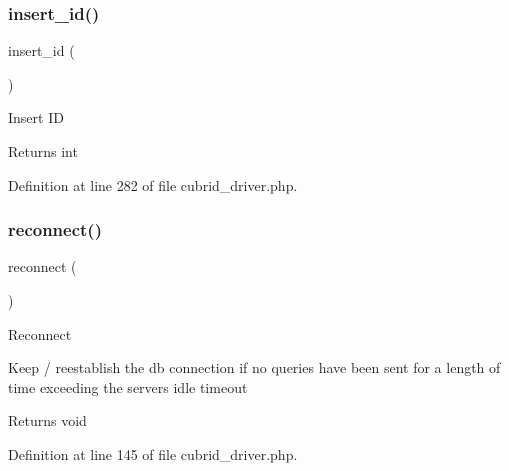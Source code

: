 \mbox{\label{class_c_i___d_b__cubrid__driver_a933f2cde8dc7f87875e257d0a4902e99}} 
\subsubsection{\texorpdfstring{insert\_id()}{insert\_id()}}
{\footnotesize\ttfamily insert\+\_\+id (\begin{DoxyParamCaption}{ }\end{DoxyParamCaption})}

Insert ID

\begin{DoxyReturn}{Returns}
int 
\end{DoxyReturn}


Definition at line 282 of file cubrid\+\_\+driver.\+php.

\mbox{\label{class_c_i___d_b__cubrid__driver_a57c19c642ab3023e28d10c50f86ff0a8}} 
\subsubsection{\texorpdfstring{reconnect()}{reconnect()}}
{\footnotesize\ttfamily reconnect (\begin{DoxyParamCaption}{ }\end{DoxyParamCaption})}

Reconnect

Keep / reestablish the db connection if no queries have been sent for a length of time exceeding the server\textquotesingle{}s idle timeout

\begin{DoxyReturn}{Returns}
void 
\end{DoxyReturn}


Definition at line 145 of file cubrid\+\_\+driver.\+php.

\mbox{\label{class_c_i___d_b__cubrid__driver_a6080dae0886626b9a4cedb29240708b1}} 
